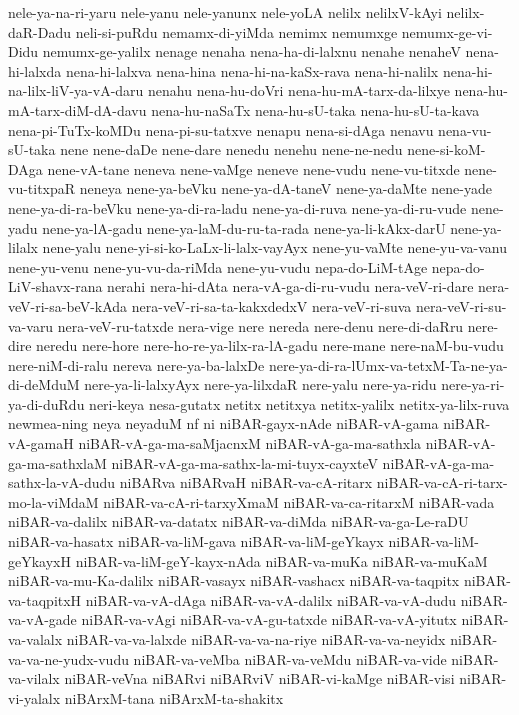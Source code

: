 {nele-ya-na-ri-yaru
nele-yanu
nele-yanunx
nele-yoLA
nelilx
nelilxV-kAyi
nelilx-daR-Dadu
neli-si-puRdu
nemamx-di-yiMda
nemimx
nemumxge
nemumx-ge-vi-Didu
nemumx-ge-yalilx
nenage
nenaha
nena-ha-di-lalxnu
nenahe
nenaheV
nena-hi-lalxda
nena-hi-lalxva
nena-hina
nena-hi-na-kaSx-rava
nena-hi-nalilx
nena-hi-na-lilx-liV-ya-vA-daru
nenahu
nena-hu-doVri
nena-hu-mA-tarx-da-lilxye
nena-hu-mA-tarx-diM-dA-davu
nena-hu-naSaTx
nena-hu-sU-taka
nena-hu-sU-ta-kava
nena-pi-TuTx-koMDu
nena-pi-su-tatxve
nenapu
nena-si-dAga
nenavu
nena-vu-sU-taka
nene
nene-daDe
nene-dare
nenedu
nenehu
nene-ne-nedu
nene-si-koM-DAga
nene-vA-tane
neneva
nene-vaMge
neneve
nene-vudu
nene-vu-titxde
nene-vu-titxpaR
neneya
nene-ya-beVku
nene-ya-dA-taneV
nene-ya-daMte
nene-yade
nene-ya-di-ra-beVku
nene-ya-di-ra-ladu
nene-ya-di-ruva
nene-ya-di-ru-vude
nene-yadu
nene-ya-lA-gadu
nene-ya-laM-du-ru-ta-rada
nene-ya-li-kAkx-darU
nene-ya-lilalx
nene-yalu
nene-yi-si-ko-LaLx-li-lalx-vayAyx
nene-yu-vaMte
nene-yu-va-vanu
nene-yu-venu
nene-yu-vu-da-riMda
nene-yu-vudu
nepa-do-LiM-tAge
nepa-do-LiV-shavx-rana
nerahi
nera-hi-dAta
nera-vA-ga-di-ru-vudu
nera-veV-ri-dare
nera-veV-ri-sa-beV-kAda
nera-veV-ri-sa-ta-kakxdedxV
nera-veV-ri-suva
nera-veV-ri-su-va-varu
nera-veV-ru-tatxde
nera-vige
nere
nereda
nere-denu
nere-di-daRru
nere-dire
neredu
nere-hore
nere-ho-re-ya-lilx-ra-lA-gadu
nere-mane
nere-naM-bu-vudu
nere-niM-di-ralu
nereva
nere-ya-ba-lalxDe
nere-ya-di-ra-lUmx-va-tetxM-Ta-ne-ya-di-deMduM
nere-ya-li-lalxyAyx
nere-ya-lilxdaR
nere-yalu
nere-ya-ridu
nere-ya-ri-ya-di-duRdu
neri-keya
nesa-gutatx
netitx
netitxya
netitx-yalilx
netitx-ya-lilx-ruva
newmea-ning
neya
neyaduM
nf
ni
niBAR-gayx-nAde
niBAR-vA-gama
niBAR-vA-gamaH
niBAR-vA-ga-ma-saMjacnxM
niBAR-vA-ga-ma-sathxla
niBAR-vA-ga-ma-sathxlaM
niBAR-vA-ga-ma-sathx-la-mi-tuyx-cayxteV
niBAR-vA-ga-ma-sathx-la-vA-dudu
niBARva
niBARvaH
niBAR-va-cA-ritarx
niBAR-va-cA-ri-tarx-mo-la-viMdaM
niBAR-va-cA-ri-tarxyXmaM
niBAR-va-ca-ritarxM
niBAR-vada
niBAR-va-dalilx
niBAR-va-datatx
niBAR-va-diMda
niBAR-va-ga-Le-raDU
niBAR-va-hasatx
niBAR-va-liM-gava
niBAR-va-liM-geYkayx
niBAR-va-liM-geYkayxH
niBAR-va-liM-geY-kayx-nAda
niBAR-va-muKa
niBAR-va-muKaM
niBAR-va-mu-Ka-dalilx
niBAR-vasayx
niBAR-vashacx
niBAR-va-taqpitx
niBAR-va-taqpitxH
niBAR-va-vA-dAga
niBAR-va-vA-dalilx
niBAR-va-vA-dudu
niBAR-va-vA-gade
niBAR-va-vAgi
niBAR-va-vA-gu-tatxde
niBAR-va-vA-yitutx
niBAR-va-valalx
niBAR-va-va-lalxde
niBAR-va-va-na-riye
niBAR-va-va-neyidx
niBAR-va-va-ne-yudx-vudu
niBAR-va-veMba
niBAR-va-veMdu
niBAR-va-vide
niBAR-va-vilalx
niBAR-veVna
niBARvi
niBARviV
niBAR-vi-kaMge
niBAR-visi
niBAR-vi-yalalx
niBArxM-tana
niBArxM-ta-shakitx
}
